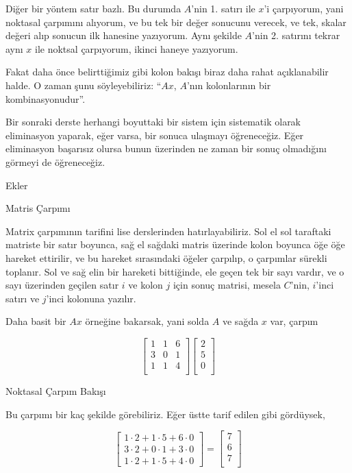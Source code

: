 \documentclass[12pt,fleqn]{article}\usepackage{../../common}
\begin{document}
Diğer bir yöntem satır bazlı. Bu durumda $A$'nin 1. satırı ile $x$'i
çarpıyorum, yani noktasal çarpımını alıyorum, ve bu tek bir değer sonucunu
verecek, ve tek, skalar değeri alıp sonucun ilk hanesine yazıyorum. Aynı
şekilde $A$'nin 2. satırını tekrar aynı $x$ ile noktsal çarpıyorum, ikinci
haneye yazıyorum. 

Fakat daha önce belirttiğimiz gibi kolon bakışı biraz daha rahat
açıklanabilir halde. O zaman şunu söyleyebiliriz: ``$Ax$, $A$'nın
kolonlarının bir kombinasyonudur''. 

Bir sonraki derste herhangi boyuttaki bir sistem için sistematik olarak
eliminasyon yaparak, eğer varsa, bir sonuca ulaşmayı öğreneceğiz. Eğer
eliminasyon başarısız olursa bunun üzerinden ne zaman bir sonuç olmadığını
görmeyi de öğreneceğiz. 

Ekler

Matris Çarpımı

Matrix çarpımının tarifini lise derslerinden hatırlayabiliriz. Sol el
sol taraftaki matriste bir satır boyunca, sağ el sağdaki matris
üzerinde kolon boyunca öğe öğe hareket ettirilir, ve bu hareket
sırasındaki öğeler çarpılıp, o çarpımlar sürekli toplanır. Sol ve sağ
elin bir hareketi bittiğinde, ele geçen tek bir sayı vardır, ve o sayı
üzerinden geçilen satır $i$ ve kolon $j$ için sonuç matrisi, mesela
$C$'nin, $i$'inci satırı ve $j$'inci kolonuna yazılır.

Daha basit bir $Ax$ örneğine bakarsak, yani solda $A$ ve sağda $x$
var, çarpım

$$
\left[\begin{array}{ccc}
1 & 1 & 6 \\
3 & 0 & 1 \\
1 & 1 & 4 \\
\end{array}\right]
\left[\begin{array}{ccc}
2  \\
5  \\
0  \\
\end{array}\right]
$$

Noktasal Çarpım Bakışı

Bu çarpımı bir kaç şekilde görebiliriz. Eğer üstte tarif edilen gibi gördüysek,

$$
\left[\begin{array}{ccc}
1\cdot 2 + 1\cdot 5 + 6\cdot 0 \\
3\cdot 2 + 0\cdot 1 + 3\cdot 0 \\
1\cdot 2 + 1\cdot 5 + 4\cdot 0 
\end{array}\right]
=
\left[\begin{array}{c}
7 \\
6 \\
7 \\
\end{array}\right]
$$
\end{document}
